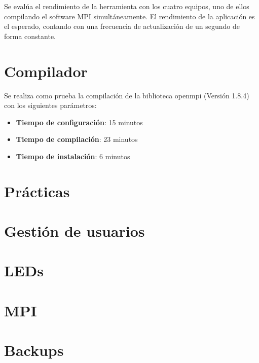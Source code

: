 \documentclass{article}
\begin{document}
Se evalúa el rendimiento de la herramienta con los cuatro equipos, uno de ellos compilando el software MPI simultáneamente. El rendimiento de la aplicación es el esperado, contando con una frecuencia de actualización de un segundo de forma constante.

\section{Compilador}

Se realiza como prueba la compilación de la biblioteca openmpi (Versión 1.8.4) con los siguientes parámetros:

\texttt{}
\begin{itemize}
\item \textbf{Tiempo de configuración}: 15 minutos
\item \textbf{Tiempo de compilación}: 23 minutos
\item \textbf{Tiempo de instalación}: 6 minutos
\end{itemize}

\section{Prácticas}

\section{Gestión de usuarios}

\section{LEDs}

\section{MPI}

\section{Backups}
\end{document}
